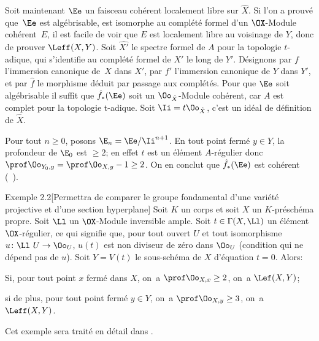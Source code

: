 Soit maintenant $\Ee$ un faisceau coh\'erent localement libre sur $\hat{X}$. Si l'on a prouv\'e que~$\Ee$ est alg\'ebrisable, \ie est isomorphe au compl\'et\'e formel d'un $\OX$-Module coh\'erent~$E$, il est facile de voir que $E$ est localement libre au voisinage de $Y$, donc de prouver $\Leff (X, Y)$. Soit $\widehat{X'}$ le spectre formel de $A$ pour la topologie $t$-adique, qui s'identifie au compl\'et\'e formel de $X'$ le long de $Y'$. D\'esignons par $f$ l'immersion canonique de~$X$ dans $X'$, par $f'$ l'immersion canonique de $Y$ dans $Y'$, et par $\hat{f}$ le morphisme d\'eduit par passage aux compl\'et\'es. Pour que $\Ee$ soit alg\'ebrisable il suffit que $\hat{f}_\ast(\Ee)$ soit un $\Oo_{\hat{X}}$-Module coh\'erent, car $A$ est complet pour la topologie t-adique. Soit $\Ii = t\Oo_{\hat{X}}$, c'est un id\'eal de d\'efinition de $\hat{X}$.

Pour tout $n\geq 0$, posons $\E_n=\Ee/\Ii^{n+1}$. En tout point ferm\'e $y\in Y$, la profondeur de $\E_0$ est $\geq 2$; en effet $t$ est un \'el\'ement $A$-r\'egulier donc $\prof\Oo_{Y_0, y}=\prof\Oo_{X, y}-1\geq 2$. On en conclut que $\hat{f}_\ast(\Ee)$ est coh\'erent (~). \cqfd

\label{X.2.2}
\begin{enonce*}[remark]{Exemple 2.2}[{{\normalfont Permettra de comparer le groupe fondamental d'une vari\'et\'e projective et d'une section hyperplane}}]
Soit $K$ un corps et soit $X$ un $K$-pr\'esch\'ema propre. Soit $\Ll$ un $\OX$-Module inversible ample. Soit $t \in \Gamma(X, \Ll)$ un \'el\'ement $\OX$-r\'egulier\pageoriginale, ce qui signifie que, pour tout ouvert $U$ et tout isomorphisme $u\colon \Ll~U\to\Oo_U$, \/$u(t)$ est non diviseur de z\'ero dans $\Oo_U$ (condition qui ne d\'epend pas de $u$). Soit $Y = V(t)$ le sous-sch\'ema de $X$ d'\'equation $t = 0$. Alors:
\begin{enumeratei}
\item
Si, pour tout point $x$ ferm\'e dans $X$, on~a $\prof\Oo_{X, x}\geq 2$, on~a $\Lef (X, Y)$;

\item
si de plus, pour tout point ferm\'e $y\in Y$, on~a $\prof\Oo_{X, y}\geq 3$, on~a $\Leff (X, Y)$.
\end{enumeratei}
\end{enonce*}

Cet exemple sera trait\'e en d\'etail dans \Exp {}.

